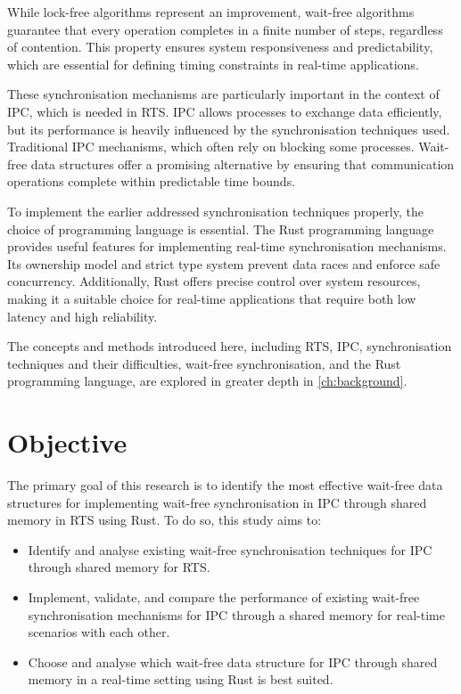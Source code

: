 While lock-free algorithms represent an improvement, wait-free algorithms guarantee that every operation completes in a finite number of steps, regardless of contention. This property ensures system responsiveness and predictability, which are essential for defining timing constraints in real-time applications. \cite{kogan2012methodology, herlihy1991wait, brandenburg2019multiprocessorrealtimelockingprotocols}

These synchronisation mechanisms are particularly important in the context of \ac{IPC}, which is needed in \ac{RTS}. \ac{IPC} allows processes to exchange data efficiently, but its performance is heavily influenced by the synchronisation techniques used. Traditional \ac{IPC} mechanisms, which often rely on blocking some processes. Wait-free data structures offer a promising alternative by ensuring that communication operations complete within predictable time bounds. \cite{timnat2014practical, michael1996simple, huang2002improvingWaitFree, pellegrini2020relevancewaitfreecoordinationalgorithms}

To implement the earlier addressed synchronisation techniques properly, the choice of programming language is essential. The Rust programming language provides useful features for implementing real-time synchronisation mechanisms. Its ownership model and strict type system prevent data races and enforce safe concurrency. Additionally, Rust offers precise control over system resources, making it a suitable choice for real-time applications that require both low latency and high reliability. \cite{xu2023rust, sharma2024rustembeddedsystemscurrent}

The concepts and methods introduced here, including \ac{RTS}, \ac{IPC}, synchronisation techniques and their difficulties, wait-free synchronisation, and the Rust programming language, are explored in greater depth in \cref{ch:background}. 

\section{Objective}\label{sec:objective}
The primary goal of this research is to identify the most effective wait-free data structures for implementing wait-free synchronisation in \ac{IPC} through shared memory in \ac{RTS} using Rust. To do so, this study aims to:

\begin{itemize}
\item Identify and analyse existing wait-free synchronisation techniques for \ac{IPC} through shared memory for \ac{RTS}.
\item Implement, validate, and compare the performance of existing wait-free synchronisation mechanisms for \ac{IPC} through a shared memory for real-time scenarios with each other.
\item Choose and analyse which wait-free data structure for \ac{IPC} through shared memory in a real-time setting using Rust is best suited.
\end{itemize}

